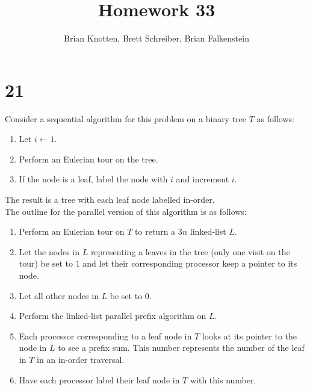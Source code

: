 \documentclass[letterpaper,notitlepage,twoside]{article}
\begin{document}
\title{Homework 33}
\author{Brian Knotten, Brett Schreiber, Brian Falkenstein}
\maketitle

\section*{21}
Consider a sequential algorithm for this problem on a binary tree $T$ as follows:
\begin{enumerate}
\item Let $i \gets 1$.
\item Perform an Eulerian tour on the tree.
\item If the node is a leaf, label the node with $i$ and increment $i$.
\end{enumerate}
The result is a tree with each leaf node labelled in-order.
\\
The outline for the parallel version of this algorithm is as follows:
\begin{enumerate}
\item Perform an Eulerian tour on $T$ to return a $3n$ linked-list $L$.
\item Let the nodes in $L$ representing a leaves in the tree (only one visit on the tour) be set to $1$ and let their corresponding processor keep a pointer to its node.
\item Let all other nodes in $L$ be set to $0$.
\item Perform the linked-list parallel prefix algorithm on $L$.
\item Each processor corresponding to a leaf node in $T$ looks at its pointer to the node in $L$ to see a prefix sum. This number represents the number of the leaf in $T$ in an in-order traversal.
\item Have each processor label their leaf node in $T$ with this number.
\end{enumerate}
\end{document}
